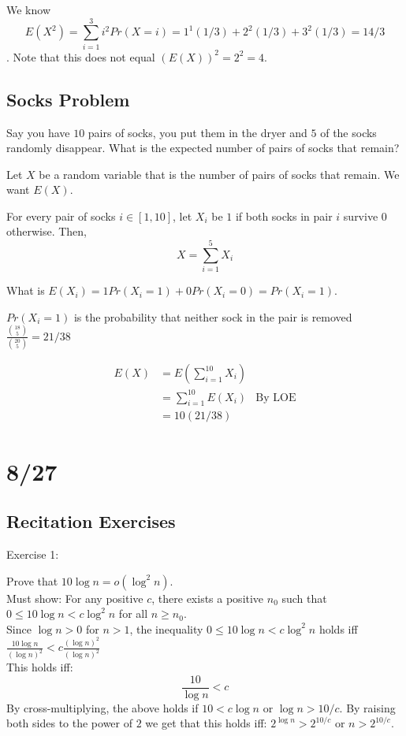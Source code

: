 \documentclass{article}
\begin{document}
We know $$E(X^2) = \sum_{i=1}^3 i^2 Pr(X = i) = 1^1 (1/3) + 2^2 (1/3) + 3^2 (1/3) = 14/3$$.  Note that this does not equal $(E(X))^2 = 2^2 = 4$.

\subsection{Socks Problem}

Say you have $10$ pairs of socks, you put them in the dryer and $5$ of the socks randomly disappear.  What is the expected number of pairs of socks that remain? 

Let $X$ be a random variable that is the number of pairs of socks that remain.  We want $E(X)$.

For every pair of socks $i \in [1,10]$, let $X_i$ be $1$ if both socks in pair $i$ survive $0$ otherwise.  Then,
$$X = \sum_{i=1}^5 X_i$$

What is $E(X_i) = 1 Pr(X_i = 1) + 0 Pr(X_i =0) = Pr(X_i = 1)$.

$Pr(X_i = 1)$ is the probability that neither sock in the pair is removed $\frac{{18 \choose 5}}{{20 \choose 5}} = 21/38$

\begin{align*}
    E(X) &= E(\sum_{i=1}^10 X_i)\\
         & = \sum_{i=1}^10 E(X_i) & \text{By LOE}\\
        & = 10 (21/38) 
\end{align*}


\section{8/27}

\subsection{Recitation Exercises}
Exercise 1:

Prove that $10 \log n = o(\log^2 n)$. \\

Must show:  For any positive $c$, there exists a positive $n_0$ such that
$0 \leq 10 \log n < c \log^2 n$ for all $n \geq n_0$.\\

Since $\log n > 0$ for $n > 1$, the inequality $0 \leq 10 \log n < c \log^2 n$ holds iff
$\frac{10 \log n}{(\log n)^{2}} < c \frac{(\log n)^{2}}{(\log n)^{2}}$\\
This holds iff:
$$\frac{10}{\log n} < c$$
By cross-multiplying, the above holds if $10 < c \log n$ or $\log n > 10/c$.  By raising both sides to the power of $2$ we get that this holds iff:
$2^{\log n} > 2^{10/c}$ or $n > 2^{10/c}$.
\end{document}
